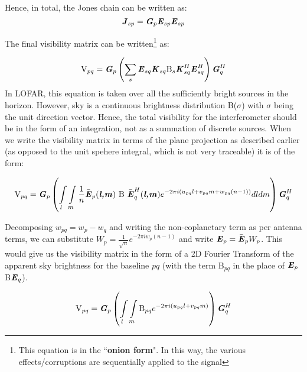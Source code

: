\documentclass[../main/thesis_msc.tex]{subfiles}
\begin{document}
\noindent Hence, in total, the Jones chain can be written as:
\begin{equation}
\textbf{\textit{J}}_{sp} =  \textbf{\textit{G}}_{p} \textbf{\textit{E}}_{sp} \textbf{\textit{E}}_{sp}
\end{equation}

\noindent The final visibility matrix can be written\footnote{This equation is in the ``\textbf{onion form}". In this way, the various effects/corruptions are sequentially applied to the signal} as:

\begin{equation}
\textrm{V}_{pq}=\textbf{\textit{G}}_{p} \left( \sum\limits_{s} \textbf{\textit{E}}_{sq} \textbf{\textit{K}}_{sq} \textrm{B}_s \textbf{\textit{K}}^H_{sq} \textbf{\textit{E}}^H_{sq} \right) \textbf{\textit{G}}^H_{q}
\end{equation}
In LOFAR, this equation is taken over all the sufficiently bright sources in the horizon. However, sky is a continuous brightness distribution B($\sigma$) with $\sigma$ being the unit direction vector. Hence, the total visibility for the interferometer should be in the form of an integration, not as a summation of discrete sources. When we write the visibility matrix in terms of the plane projection as described earlier (as opposed to the unit spehere integral, which is not very traceable) it is of the form: 

\begin{equation}
\textrm{V}_{pq}= \textbf{\textit{G}}_{p} \left( \int\limits_{l} \int\limits_{m} \frac{1}{n} \bar{\textbf{\textit{E}}}_{p}  (\textbf{\textit{l,m}}) \text{ B } \bar{\textbf{\textit{E}}}^H_{q} (\textbf{\textit{l,m}}) e^{-2 \pi i(u_{pq}l + v_{pq}m + w_{pq}(n-1))} dl dm \right) \textbf{\textit{G}}^H_{q}
\label{wterm}
\end{equation}

\noindent Decomposing $w_{pq} = w_p - w_q$ and writing the non-coplanetary term as per antenna terms, we can substitute $W_p= \frac{1}{\sqrt{n}} e ^{-2 \pi i w_p (n-1)}$ and write $\textbf{\textit{E}}_p =  \bar{\textbf{\textit{E}}}_p W_p $. This would give us the visibility matrix in the form of a 2D Fourier Transform  of the apparent sky brightness for the baseline $pq$ (with the term B$_{pq}$ in the place of  $\textbf{\textit{E}}_{p}$B$\textbf{\textit{E}}_{q}$). 

\begin{equation}
\textrm{V}_{pq} = \textbf{\textit{G}}_{p}  \left( \int\limits_{l} \int\limits_{m} \textrm{B}_{pq} e^{-2 \pi i(u_{pq}l + v_{pq}m)} \right) \textbf{\textit{G}}^H_{q}
\end{equation}
\end{document}
